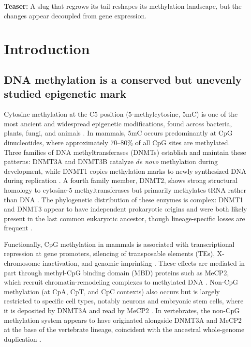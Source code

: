 \documentclass[12pt]{article}
\begin{document}
\noindent\textbf{Teaser:} A slug that regrows its tail reshapes its methylation landscape, but the changes appear decoupled from gene expression.

\newpage


\section*{Introduction}

\subsection*{DNA methylation is a conserved but unevenly studied epigenetic mark}

Cytosine methylation at the C5 position (5-methylcytosine, 5mC) is one of the most ancient and widespread epigenetic modifications, found across bacteria, plants, fungi, and animals \cite{lykoDNAMethyltransferaseFamily2018}. In mammals, 5mC occurs predominantly at CpG dinucleotides, where approximately 70--80\% of all CpG sites are methylated. Three families of DNA methyltransferases (DNMTs) establish and maintain these patterns: DNMT3A and DNMT3B catalyze \textit{de novo} methylation during development, while DNMT1 copies methylation marks to newly synthesized DNA during replication \cite{lykoDNAMethyltransferaseFamily2018, deStructuralInsightDNMT12024}. A fourth family member, DNMT2, shows strong structural homology to cytosine-5 methyltransferases but primarily methylates tRNA rather than DNA \cite{jurkowskiEvolutionaryOriginEukaryotic2011}. The phylogenetic distribution of these enzymes is complex: DNMT1 and DNMT3 appear to have independent prokaryotic origins and were both likely present in the last common eukaryotic ancestor, though lineage-specific losses are frequent \cite{pongerEvolutionaryDiversificationDNA2005, jurkowskiEvolutionaryOriginEukaryotic2011}.

Functionally, CpG methylation in mammals is associated with transcriptional repression at gene promoters, silencing of transposable elements (TEs), X-chromosome inactivation, and genomic imprinting \cite{lykoDNAMethyltransferaseFamily2018}. These effects are mediated in part through methyl-CpG binding domain (MBD) proteins such as MeCP2, which recruit chromatin-remodeling complexes to methylated DNA \cite{nan1998transcriptional}. Non-CpG methylation (at CpA, CpT, and CpC contexts) also occurs but is largely restricted to specific cell types, notably neurons and embryonic stem cells, where it is deposited by DNMT3A and read by MeCP2 \cite{jangCpGNonCpGMethylation2017, demendozaEmergenceBrainNonCpG2021}. In vertebrates, the non-CpG methylation system appears to have originated alongside DNMT3A and MeCP2 at the base of the vertebrate lineage, coincident with the ancestral whole-genome duplication \cite{demendozaEmergenceBrainNonCpG2021}.
\end{document}
